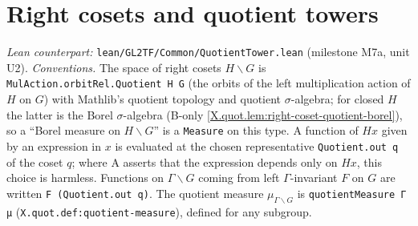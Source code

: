 \section{Right cosets and quotient towers}\label{sec:quot-tower}

\noindent\emph{Lean counterpart:} \texttt{lean/GL2TF/Common/QuotientTower.lean} (milestone M7a, unit U2). \emph{Conventions.} The space of right cosets
$H\backslash G$ is \texttt{MulAction.orbitRel.Quotient H G} (the orbits of the left multiplication action of $H$ on $G$) with Mathlib's quotient topology
and quotient $\sigma$-algebra; for closed $H$ the latter is the Borel $\sigma$-algebra (B-only \cref{X.quot.lem:right-coset-quotient-borel}), so a
``Borel measure on $H\backslash G$'' is a \texttt{Measure} on this type. A function of $Hx$ given by an expression in $x$ is evaluated at the chosen
representative \texttt{Quotient.out q} of the coset $q$; where A asserts that the expression depends only on $Hx$, this choice is harmless. Functions on
$\Gamma\backslash G$ coming from left $\Gamma$-invariant $F$ on $G$ are written \texttt{F (Quotient.out q)}. The quotient measure
$\mu_{\Gamma\backslash G}$ is \texttt{quotientMeasure Γ μ} (\texttt{X.quot.def:quotient-measure}), defined for any subgroup.

